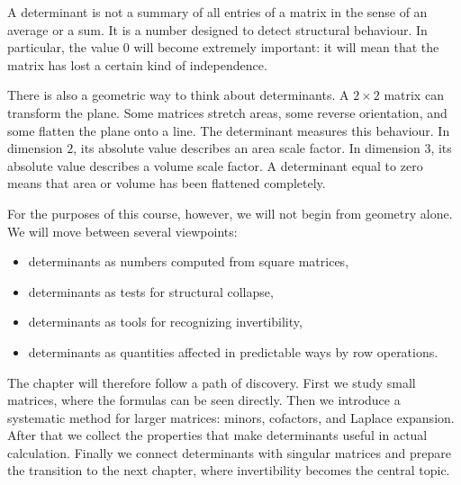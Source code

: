 \begin{remarkbox}
A determinant is not a summary of all entries of a matrix in the sense of an average or a sum. It is a number designed to detect structural behaviour. In particular, the value \(0\) will become extremely important: it will mean that the matrix has lost a certain kind of independence.
\end{remarkbox}

There is also a geometric way to think about determinants. A \(2\times2\) matrix can transform the plane. Some matrices stretch areas, some reverse orientation, and some flatten the plane onto a line. The determinant measures this behaviour. In dimension \(2\), its absolute value describes an area scale factor. In dimension \(3\), its absolute value describes a volume scale factor. A determinant equal to zero means that area or volume has been flattened completely.

For the purposes of this course, however, we will not begin from geometry alone. We will move between several viewpoints:
\begin{itemize}
\item determinants as numbers computed from square matrices,
\item determinants as tests for structural collapse,
\item determinants as tools for recognizing invertibility,
\item determinants as quantities affected in predictable ways by row operations.
\end{itemize}

The chapter will therefore follow a path of discovery. First we study small matrices, where the formulas can be seen directly. Then we introduce a systematic method for larger matrices: minors, cofactors, and Laplace expansion. After that we collect the properties that make determinants useful in actual calculation. Finally we connect determinants with singular matrices and prepare the transition to the next chapter, where invertibility becomes the central topic.
